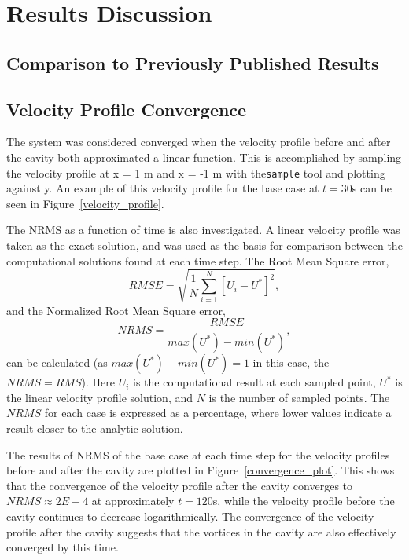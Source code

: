 \documentclass[twocolumn,10pt]{asme2ej}
\begin{document}
\section{Results Discussion}
\subsection{Comparison to Previously Published Results}

\subsection{Velocity Profile Convergence}
The system was considered converged when the velocity profile before and after the cavity both approximated a linear function. This is accomplished by sampling the velocity profile at x = 1 m and x = -1 m with the\lstinline{sample} tool and plotting against y. An example of this velocity profile for the base case at $t=30$s can be seen in Figure~\ref{velocity_profile}.

The NRMS as a function of time is also investigated. A linear velocity profile was taken as the exact solution, and was used as the basis for comparison between the computational solutions found at each time step. The Root Mean Square error,
\begin{equation}
RMSE = \sqrt{\frac{1}{N}\sum\limits_{i=1}^N[U_i - U^*]^2},
\end{equation}
and the Normalized Root Mean Square error,
\begin{equation}
NRMS = \dfrac{RMSE}{max(U^*)-min(U^*)},
\end{equation}
can be calculated (as $max(U^*)-min(U^*) = 1$ in this case, the $NRMS = RMS$). Here $U_i$ is the computational result at each sampled point, $U^*$ is the linear velocity profile solution, and $N$ is the number of sampled points. The $NRMS$ for each case is expressed as a percentage, where lower values indicate a result closer to the analytic solution.

The results of NRMS of the base case at each time step for the velocity profiles before and after the cavity are plotted in Figure~\ref{convergence_plot}. This shows that the convergence of the velocity profile after the cavity converges to $NRMS \approx 2E-4$ at approximately $t=120$s, while the velocity profile before the cavity continues to decrease logarithmically. The convergence of the velocity profile after the cavity suggests that the vortices in the cavity are also effectively converged by this time.
\end{document}
